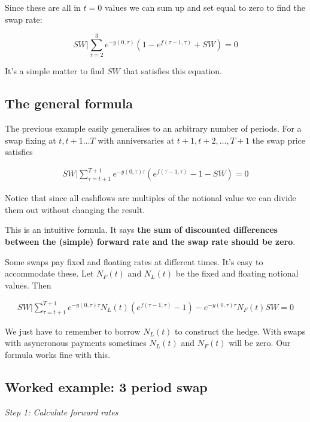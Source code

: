 Since these are all in $t=0$ values we can sum up and set equal to zero to find the swap rate:

\[SW | \sum_{\tau=2}^3  e^{-y(0,\tau)}(1-e^{f(\tau-1,\tau)} +SW) = 0 \]

It's a simple matter to find $SW$ that satisfies this equation.

\subsection{The general formula}

The previous example easily generalises to an arbitrary number of periods. For a swap fixing at $t, t+1 \ldots T$ with anniversaries at $t+1,t+2,\ldots,T+1$ the swap price satisfies

\begin{eqnarray}
SW  | \sum_{\tau=t+1}^{T+1}  e^{-y(0,\tau)\tau}(e^{f(\tau-1,\tau)}-1 -SW) = 0  \label{swapprice}
\end{eqnarray}

Notice that since all cashflows are multiples of the notional value we can divide them out  without changing the result. 

This is an intuitive formula. It says \textbf{the sum of discounted differences between the (simple) forward rate and the swap rate should be zero}.

Some swaps pay fixed and floating rates at different times. It's easy to accommodate these. Let $N_F(t)$ and $N_L(t)$ be the fixed and floating notional values. Then 

\begin{eqnarray*}
SW  | \sum_{\tau=t+1}^{T+1}  e^{-y(0,\tau)\tau}N_L(t)(e^{f(\tau-1,\tau)}-1)  - e^{-y(0,\tau)\tau}N_F(t)SW = 0  \label{swapgeneral}
\end{eqnarray*}

We just have to remember to borrow $N_L(t)$ to construct the hedge. With swaps with asyncronous payments sometimes $N_L(t)$ and $N_F(t)$ will be zero. Our formula works fine with this.


\subsection{Worked example: 3 period swap}

\textit{Step 1: Calculate forward rates}\\

